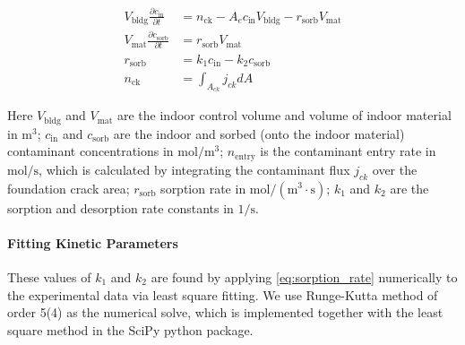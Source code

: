 \begin{align}
  V_\mathrm{bldg} \frac{\partial c_\mathrm{in}}{\partial t} &= n_\mathrm{ck} - A_e c_\mathrm{in} V_\mathrm{bldg} - r_\mathrm{sorb} V_\mathrm{mat}\label{eq:cstr} \\
  V_\mathrm{mat} \frac{\partial c_\mathrm{sorb}}{\partial t} &= r_\mathrm{sorb} V_\mathrm{mat}\label{eq:sorbed_concentration} \\
  r_\mathrm{sorb} &= k_1 c_\mathrm{in} - k_2 c_\mathrm{sorb}\label{eq:sorption_rate}\\
  n_\mathrm{ck} &= \int_{A_{ck}} j_{ck} dA
\end{align}

Here $V_\mathrm{bldg}$ and $V_\mathrm{mat}$ are the indoor control volume and volume of indoor material in $\mathrm{m^3}$;
$c_\mathrm{in}$ and $c_\mathrm{sorb}$ are the indoor and sorbed (onto the indoor material) contaminant concentrations in $\mathrm{mol/m^3}$;
$n_\mathrm{entry}$ is the contaminant entry rate in $\mathrm{mol/s}$, which is calculated by integrating the contaminant flux $j_{ck}$ over the foundation crack area;
$r_\mathrm{sorb}$ sorption rate in $\mathrm{mol/(m^3 \cdot s)}$;
$k_1$ and $k_2$ are the sorption and desorption rate constants in $\mathrm{1/s}$.\par

\paragraph{Fitting Kinetic Parameters}

These values of $k_1$ and $k_2$ are found by applying \eqref{eq:sorption_rate} numerically to the experimental data via least square fitting.
We use Runge-Kutta method of order 5(4) as the numerical solve, which is implemented together with the least square method in the SciPy python package\cite{jones_scipy_2011}.


